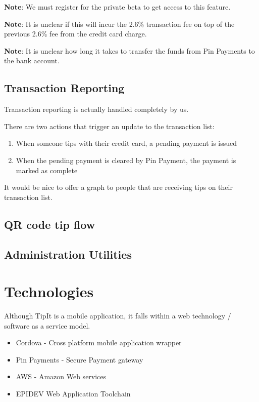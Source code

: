 \documentclass[a4paper, 11pt, oneside]{Thesis}  %
\begin{document}
 \textbf{Note}: We must register for the private beta to get access to this feature.

 \textbf{Note}: It is unclear if this will incur the 2.6\% transaction fee on top of the previous 2.6\% fee from the credit card charge.

 \textbf{Note}: It is unclear how long it takes to transfer the funds from Pin Payments to the bank account.

\section{Transaction Reporting}

Transaction reporting is actually handled completely by us.

There are two actions that trigger an update to the transaction list:

\begin{enumerate}
\item  When someone tips with their credit card, a pending payment is issued
\item  When the pending payment is cleared by Pin Payment, the payment is marked as complete
\end{enumerate}

It would be nice to offer a graph to people that are receiving tips on their transaction list.
\section{QR code tip flow}
\section{Administration Utilities}
\chapter{Technologies}
\label{Technologies}

Although TipIt is a mobile application, it falls within a web technology / software as a service model.

\begin{itemize}
\item  Cordova - Cross platform mobile application wrapper
\item  Pin Payments - Secure Payment gateway
\item  AWS - Amazon Web services
\item  EPIDEV Web Application Toolchain
\end{itemize}
\end{document}
